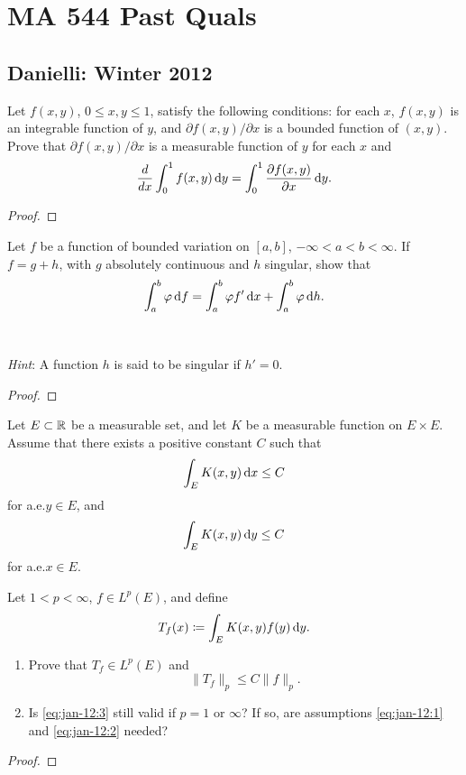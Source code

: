 \chapter{MA 544 Past Quals}
\section{Danielli: Winter 2012}
\begin{problem}
Let $f(x,y)$, $0\leq x,y\leq 1$, satisfy the following conditions: for each
$x$, $f(x,y)$ is an integrable function of $y$, and $\partial
f(x,y)/\partial x$ is a bounded function of $(x,y)$. Prove that $\partial
f(x,y)/\partial x$ is a measurable function of $y$ for each $x$ and
\[
\frac{d}{dx}\int_0^1f(x,y)\mathop{}\!\mathrm{d} y=
\int_0^1\frac{\partial f(x,y)}{\partial x}\mathop{}\!\mathrm{d} y.
\]
\end{problem}
\begin{proof}
\end{proof}

\begin{problem}
Let $f$ be a function of bounded variation on $[a,b]$,
$-\infty<a<b<\infty$. If $f=g+h$, with $g$ absolutely continuous and $h$
singular, show that
\[
\int_a^b\varphi\mathop{}\!\mathrm{d} f=\int_a^b\varphi f'\mathop{}\!\mathrm{d} x+\int_a^b\varphi\mathop{}\!\mathrm{d} h.
\]
\\\\
\emph{Hint}: A function $h$ is said to be singular if $h'=0$.
\end{problem}
\begin{proof}
\end{proof}

\begin{problem}
Let $E\subset\mathbb{R}$ be a measurable set, and let $K$ be a measurable
function on $E\times E$. Assume that there exists a positive constant $C$
such that
\begin{equation}
\label{eq:jan-12:1}
\int_E K(x,y)\mathop{}\!\mathrm{d} x\leq C
\end{equation}
for a.e.\@ $y\in E$, and
\begin{equation}
\label{eq:jan-12:2}
\int_E K(x,y)\mathop{}\!\mathrm{d} y\leq C
\end{equation}
for a.e.\@ $x\in E$.

Let $1<p<\infty$, $f\in L^p(E)$, and define
\[
T_f(x)\coloneq\int_E K(x,y)f(y)\mathop{}\!\mathrm{d} y.
\]
\begin{enumerate}[label=(\alph*),noitemsep]
\item Prove that $T_f\in L^p(E)$ and
\begin{equation}
\label{eq:jan-12:3}
\|T_f\|_p\leq C\|f\|_p.
\end{equation}
\item Is \eqref{eq:jan-12:3} still valid if $p=1$ or $\infty$? If so, are
  assumptions \eqref{eq:jan-12:1} and \eqref{eq:jan-12:2} needed?
\end{enumerate}
\end{problem}
\begin{proof}
\end{proof}

